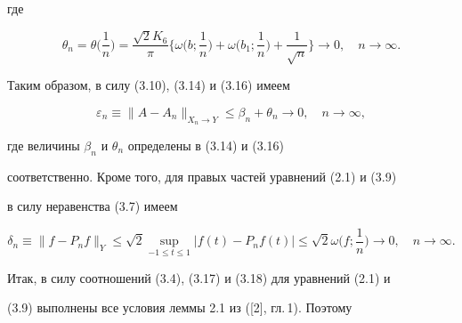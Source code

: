 где


$$


\theta_n=\theta\bigg(\frac{1}{n}\bigg)=\frac{\sqrt{2}K_6}{\pi}


\bigg\{\omega\bigg(b;\frac{1}{n}\bigg)


+\omega\bigg(b_1;\frac{1}{n}\bigg)+\frac{1}{\sqrt{n}}\bigg\}


\to 0, \quad n\to\infty. 


$$





Таким образом, в силу (3.10), (3.14) и (3.16) имеем


\begin{equation}


\varepsilon_n\equiv\| A-A_n\|_{X_n\to Y}\leq\beta_n+\theta_n\to 0, 


\quad n\to\infty, 


\end{equation}


где величины $\beta_n$ и $\theta_n$ определены в (3.14) и (3.16)


соответственно. Кроме того, для правых частей уравнений (2.1) и (3.9) 


в силу неравенства (3.7) имеем 


\begin{equation}


\delta_n\equiv\| f-P_nf\|_Y\leq\sqrt{2}\sup_{-1\leq t\leq 1}


| f(t)-P_nf(t)|\leq\sqrt{2}\omega\bigg(f;\frac{1}{n}\bigg)\to 0,


\quad n\to\infty. 


\end{equation}





Итак, в силу соотношений (3.4), (3.17) и (3.18) для уравнений (2.1) и


(3.9) выполнены все условия леммы 2.1 из ([2], гл.\,1). Поэтому


